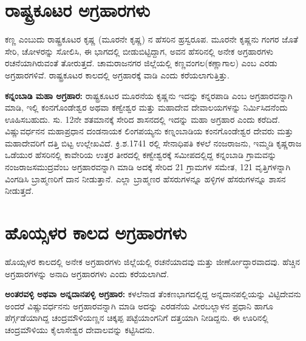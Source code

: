 \section{ರಾಷ್ಟ್ರಕೂಟರ ಅಗ್ರಹಾರಗಳು}

ಕಣ್ಣ ಎಂಬುದು ರಾಷ್ಟ್ರಕೂಟರ ಕೃಷ್ಣ (ಮೂರನೇ ಕೃಷ್ಣ) ನ ಹೆಸರಿನ ಹ್ರಸ್ವರೂಪ. ಮೂರನೇ ಕೃಷ್ಣನು ಗಂಗರ ಜೊತೆ ಸೇರಿ, ಚೋಳರನ್ನು ಸೋಲಿಸಿ, ಈ ಭಾಗದಲ್ಲಿ ಬೀಡುಬಿಟ್ಟಿದ್ದಾಗ, ಅವನ ಹೆಸರಿನಲ್ಲಿ ಅನೇಕ ಅಗ್ರಹಾರಗಳು ರಚನೆಯಾಗಿರುವಂತೆ ತೋರುತ್ತದೆ. ಚಾಮರಾಜನಗರ ಜಿಲ್ಲೆಯಲ್ಲಿ ಕಣ್ಣವಂಗಲ(ಕಣ್ಣಾಗಾಲ) ಎಂಬ ಎರಡು ಅಗ್ರಹಾರಗಳಿವೆ. ರಾಷ್ಟ್ರಕೂಟರ ಕಾಲದಲ್ಲಿ ಅಗ್ರಹಾರಕ್ಕೆ ವಾಡಿ ಎಂದು ಕರೆಯಲಾಗುತ್ತಿತ್ತು. 

\textbf{ಕನ್ನಂಬಾಡಿ ಮಹಾ ಅಗ್ರಹಾರ:} ರಾಷ್ಟ್ರಕೂಟರ ಮೂರನೆಯ ಕೃಷ್ಣನು ಇದನ್ನು ಕನ್ನರಪಾಡಿ ಎಂಬ ಅಗ್ರಹಾರವನ್ನಾಗಿ ಮಾಡಿ, ಇಲ್ಲಿ ಕಂನಗೊಂಡೇಶ್ವರ ಅಥವಾ ಕಣ್ವೇಶ್ವರ ಮತ್ತು ಮಹಾದೇವ ದೇವಾಲಯಗಳನ್ನು ನಿರ್ಮಿಸಿದನೆಂದು ಊಹಿಸಬಹುದು. ಸು. 12ನೇ ಶತಮಾನಕ್ಕೆ ಸೇರಿದ ಶಾಸನದಲ್ಲಿ ಇದನ್ನು ಮಹಾ ಅಗ್ರಹಾರ ಎಂದು ಕರೆದಿದೆ. ವಿಷ್ಣುವರ್ಧನನ ಮಹಾಪ್ರಧಾನ ದಂಡನಾಯಕ ಲಿಂಗಪಯ್ಯನು ಕಣ್ನಂಬಾಡಿಯ ಕಂನಗೊಂಡೇಶ್ವರ ದೇವರು ಮತ್ತು ಮಹಾದೇವರಿಗೆ ದತ್ತಿ ಬಿಟ್ಟ ಉಲ್ಲೇಖವಿದೆ. ಕ್ರಿ.ಶ.1741 ರಲ್ಲಿ ಸೇನಾಧಿಪತಿ ಕಳಲೆ ನಂಜರಾಜನು, ಇಮ್ಮಡಿ ಕೃಷ್ಣರಾಜ ಒಡೆಯುರ ಹೆಸರಿನಲ್ಲಿ ಕಾವೇರಿಯ ಉತ್ತರ ತೀರದಲ್ಲಿ ಕಣ್ವೇಶ್ವರಕ್ಕೆ ಸಮೀಪದಲ್ಲಿದ್ದ ಕನ್ನಂಬಾಡಿ ಗ್ರಾಮವನ್ನು ನಂಜರಾಜಸಮುದ್ರವೆಂಬ ಅಗ್ರಹಾರವನ್ನಾಗಿ ಮಾಡಿ ಅದಕ್ಕೆ ಸೇರಿದ 21 ಗ್ರಾಮಗಳ ಸಮೇತ, 121 ವೃತ್ತಿಗಳನ್ನಾಗಿ ವಿಂಗಡಿಸಿ ಬ್ರಾಹ್ಮಣರಿಗೆ ದಾನ ನೀಡುತ್ತಾನೆ. ಎಲ್ಲಾ ಬ್ರಾಹ್ಮಣರ ಹೆಸರುಗಳನ್ನೂ ಹಳ್ಳಿಗಳ ಹೆಸರುಗಳನ್ನೂ ಶಾಸನ ನೀಡುತ್ತದೆ.


\section{ಹೊಯ್ಸಳರ ಕಾಲದ ಅಗ್ರಹಾರಗಳು}

ಹೊಯ್ಸಳರ ಕಾಲದಲ್ಲಿ ಅನೇಕ ಅಗ್ರಹಾರಗಳು ಜಿಲ್ಲೆಯಲ್ಲಿ ರಚನೆಯಾದವು ಮತ್ತು ಜೀರ್ಣೋದ್ಧಾರವಾದವು. ಹೆಚ್ಚಿನ ಅಗ್ರಹಾರಗಳನ್ನು ಅನಾದಿ ಅಗ್ರಹಾರಗಳು ಎಂದು ಕರೆಯಲಾಗಿದೆ.

\textbf{ಅಂತರವಳ್ಳಿ ಅಥವಾ ಅನ್ನದಾನಪಳ್ಳಿ ಅಗ್ರಹಾರ: } ಕಳಲೆನಾಡ ತೆಂಕಣಭಾಗದಲ್ಲಿದ್ದ ಅನ್ನದಾನಪಲ್ಲಿಯನ್ನು ವಿಟ್ಟಿದೇವನು ಅಂದರೆ ವಿಷ್ಣುವರ್ಧನನು ಅಗ್ರಹಾರವನ್ನಾಗಿ ಮಾಡಿ ಅದನ್ನು ಎರಡನೆಯ ವೀರಬಲ್ಲಾಳನ ಪ್ರಧಾನಿ ಹಾಗೂ ಪೆರ್ಗ್ಗಡೆಯಾಗಿದ್ದ ಚಂದ್ರಮೌಳಿಯಣ್ಣನ ಚಿಕ್ಕಪ್ಪ ಪಟ್ಟೆಯಾಂಗನಿಗೆ ದತ್ತಯಾಗಿ ನೀಡಿದ್ದನು. ಈ ಊರಿನಲ್ಲಿ ಚಂದ್ರಮೌಳಿಯು ಕೈಲಾಸೇಶ್ವರ ದೇವಾಲವನ್ನು ಕಟ್ಟಿಸಿದನು.

